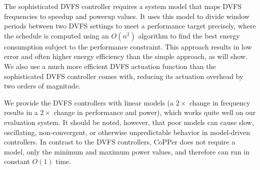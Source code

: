 The sophisticated DVFS controller requires a system model that maps DVFS frequencies to speedup and powerup values.
It uses this model to divide window periods between two DVFS settings to meet a performance target precisely, where the schedule is computed using an $O(n^2)$ algorithm to find the best energy consumption subject to the performance constraint.
This approach results in low error and often higher energy efficiency than the simple approach, as  will show.
We also use a much more efficient DVFS actuation function than the sophisticated DVFS controller comes with, reducing its actuation overhead by two orders of magnitude.

We provide the DVFS controllers with linear models (\eg a $2\times$ change in frequency results in a $2\times$ change in performance and power), which works quite well on our evaluation system.
It should be noted, however, that poor models can cause slow, oscillating, non-convergent, or otherwise unpredictable behavior in model-driven controllers.
In contrast to the DVFS controllers, CoPPer does not require a model, only the minimum and maximum power values, and therefore can run in constant $O(1)$ time.
